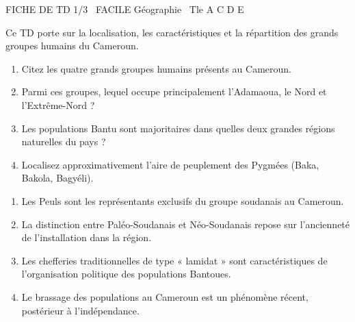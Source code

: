 \documentclass[11pt]{article}
\begin{document}
\begin{tcolorbox}[enhanced,colback=popink,colframe=popink,arc=10pt,boxrule=0pt,left=12pt,right=12pt,top=9pt,bottom=9pt]
{\color{white}\popxbold\small FICHE DE TD 1/3 \textbullet\ FACILE \hfill Géographie \textbullet\ Tle A C D E\par}
\end{tcolorbox}
\vspace{4pt}
Ce TD porte sur la localisation, les caractéristiques et la répartition des grands groupes humains du Cameroun.

\begin{exercice}
\begin{enumerate}
    \item Citez les quatre grands groupes humains présents au Cameroun.
    \item Parmi ces groupes, lequel occupe principalement l'Adamaoua, le Nord et l'Extrême-Nord ?
    \item Les populations Bantu sont majoritaires dans quelles deux grandes régions naturelles du pays ?
    \item Localisez approximativement l'aire de peuplement des Pygmées (Baka, Bakola, Bagyéli).
\end{enumerate}
\end{exercice}

\begin{exercice}
\begin{enumerate}
    \item Les Peuls sont les représentants exclusifs du groupe soudanais au Cameroun.
    \item La distinction entre Paléo-Soudanais et Néo-Soudanais repose sur l'ancienneté de l'installation dans la région.
    \item Les chefferies traditionnelles de type « lamidat » sont caractéristiques de l'organisation politique des populations Bantoues.
    \item Le brassage des populations au Cameroun est un phénomène récent, postérieur à l'indépendance.
\end{enumerate}
\end{exercice}
\end{document}
